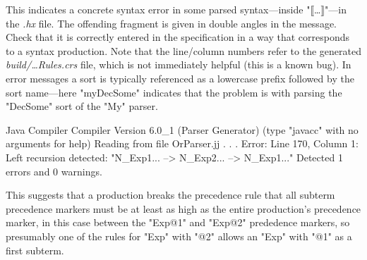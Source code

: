 \documentclass[12pt]{article} %
\begin{document}
\begin{error}\leavevmode
  This indicates a concrete syntax error in some parsed syntax---inside "⟦…⟧"---in the \emph{.hx}
  file. The offending fragment is given in double angles in the message. Check that it is correctly
  entered in the \HAX specification in a way that corresponds to a syntax production. Note that the
  line/column numbers refer to the generated \emph{build/…Rules.crs} file, which is not immediately
  helpful (this is a known bug). In error messages a sort is typically referenced as a lowercase
  prefix followed by the sort name---here "myDecSome" indicates that the problem is with parsing the
  "DecSome" sort of the "My" parser.
\end{error}

\begin{error}\leavevmode
  \begin{code}
Java Compiler Compiler Version 6.0_1 (Parser Generator)
(type "javacc" with no arguments for help)
Reading from file OrParser.jj . . .
Error: Line 170, Column 1: Left recursion detected: "N_Exp1... --> N_Exp2... --> N_Exp1..."
Detected 1 errors and 0 warnings.
  \end{code}
  This suggests that a production breaks the precedence rule that all subterm precedence markers
  must be at least as high as the entire production's precedence marker, in this case between the
  "Exp@1" and "Exp@2" prededence markers, so presumably one of the rules for "Exp" with "@2" allows
  an "Exp" with "@1" as a first subterm.
\end{error}
\end{document}
